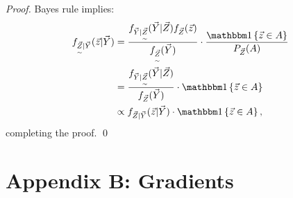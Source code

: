 {\begin{proof}
Bayes rule implies:
\begin{align*}
f_{\underset{\sim}{\vec{Z}} \vert \vec{Y}}(\vec{z} \vert \vec{Y}) &= \frac{f_{\vec{Y} \vert \underset{\sim}{\vec{Z}}}(\vec{Y} \vert \vec{Z}) f_{\vec{Z}}(\vec{z})}{f_{\underset{\sim}{\vec{Z}}}(\vec{Y})} \cdot \frac{\ind \set{\vec{z} \in A}}{P_{\vec{Z}}(A)} \\
&= \frac{f_{\vec{Y} \vert \underset{\sim}{\vec{Z}}}(\vec{Y} \vert \vec{Z})}{f_{\vec{Z}}(\vec{Y})} \cdot \ind \set{\vec{z} \in A} \\
&\propto f_{\vec{Z} \vert \vec{Y}}(\vec{z} \vert \vec{Y}) \cdot \ind\set{\vec{z} \in A},
\end{align*}
completing the proof. \qed
\end{proof}

\section*{Appendix B: Gradients}

}
